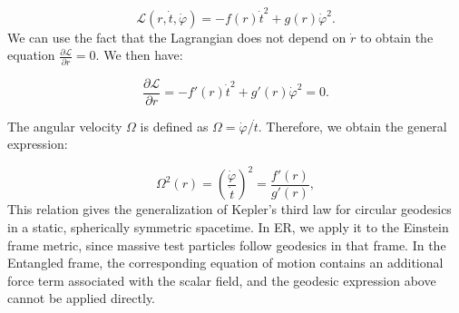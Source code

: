 \documentclass[floats,floatfix,aps, preprintnumbers,nofootinbib]{revtex4-2}
\newcommand{\paren}[1]{\left( #1 \right)}
\newcommand{\mscr}{\mathscr}
\begin{document}
\begin{equation}
    \mscr L(r, \dot t, \dot \varphi) = -f(r)\dot t^2 +g(r)\dot\varphi^2.
\end{equation}
We can use the fact that the Lagrangian does not depend on $\dot r$ to obtain the equation $\frac{\partial \mscr L}{\partial r} = 0$. We then have:

\begin{equation}
    \frac{\partial \mscr L}{\partial r} = -f'(r)\dot t^2 + g'(r)\dot\varphi^2 = 0.
\end{equation}

The angular velocity $\Omega$ is defined as $\Omega = \dot\varphi /\dot t$. Therefore, we obtain the general expression:

\begin{equation}
    \Omega^2(r) = \paren{\frac{\dot\varphi}{\dot t}}^2 = \frac{f'(r)}{g'(r)},
\end{equation}
This relation gives the generalization of Kepler's third law for circular geodesics in a static, spherically symmetric spacetime. In ER, we apply it to the Einstein frame metric, since massive test particles follow geodesics in that frame. In the Entangled frame, the corresponding equation of motion contains an additional force term associated with the scalar field, and the geodesic expression above cannot be applied directly.
\end{document}
